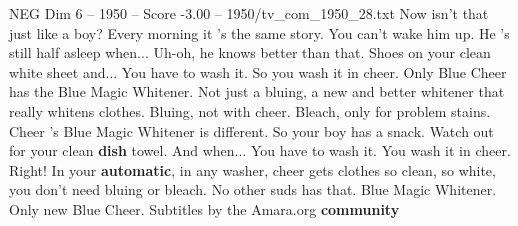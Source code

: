 \begin{textsample}{NEG Dim 6 – 1950 – Score -3.00 – 1950/tv\_com\_1950\_28.txt}  \label{ex:f6_neg_088}
Now isn't that just like a boy?
Every morning it 's the same story.
You can't wake him up.
He 's still half asleep when...
Uh-oh, he knows better than that.
Shoes on your clean white sheet and...
You have to wash it.
So you wash it in cheer.
Only Blue Cheer has the Blue Magic Whitener.
Not just a bluing, a new and better whitener that really whitens clothes.
Bluing, not with cheer.
Bleach, only for problem stains.
Cheer 's Blue Magic Whitener is different.
So your boy has a snack.
Watch out for your clean \textbf{dish} towel.
And when...
You have to wash it.
You wash it in cheer.
Right!
In your \textbf{automatic}, in any washer, cheer gets clothes so clean, so white, you don't need bluing or bleach.
No other suds has that.
Blue Magic Whitener.
Only new Blue Cheer.
Subtitles by the Amara.org \textbf{community}

\end{textsample}
